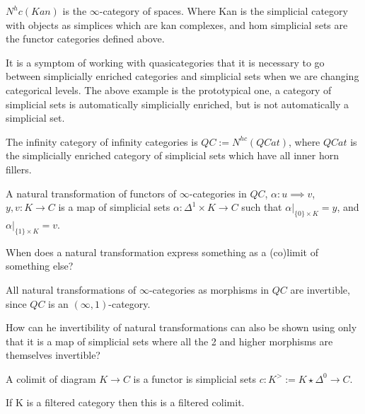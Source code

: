 \begin{proposition}
    $N^hc(Kan)$ is the $\infty$-category of spaces. Where Kan is the simplicial category with objects as simplices which are kan complexes, and hom simplicial sets are the functor categories defined above.
\end{proposition}

\begin{remark}
    It is a symptom of working with quasicategories that it is necessary to go between simplicially enriched categories and simplicial sets when we are changing categorical levels. The above example is the prototypical one, a category of simplicial sets is automatically simplicially enriched, but is not automatically a simplicial set.
\end{remark}

\begin{remark}
    The infinity category of infinity categories is $QC:=N^{hc}(QCat)$, where $QCat$ is the simplicially enriched category of simplicial sets which have all inner horn fillers.
\end{remark}

\begin{definition}
    A natural transformation of functors of $\infty$-categories in $QC$, $\alpha:u \implies v$, $y,v :K \to C$ is a map of simplicial sets $\alpha:\Delta^1\times K \to C$ such that $\alpha|_{\{0\}\times K}=y$, and $\alpha|_{\{1\}\times K}=v$.
\end{definition}

\begin{question}
    When does a natural transformation express something as a (co)limit of something else?
\end{question}
\begin{remark}
    All natural transformations of $\infty$-categories as morphisms in $QC$ are invertible, since $QC$ is an $(\infty, 1)$-category. 
\end{remark}

\begin{question}
    How can he invertibility of natural transformations can also be shown using only  that it is a map of simplicial sets where all the 2 and higher morphisms are themselves invertible?
\end{question}

\begin{remark}
    A colimit of diagram $K \to C$ is a functor is simplicial sets $c:K^> :=K\star \Delta^0 \to C$.

    If K is a filtered category then this is a filtered colimit.
\end{remark}

